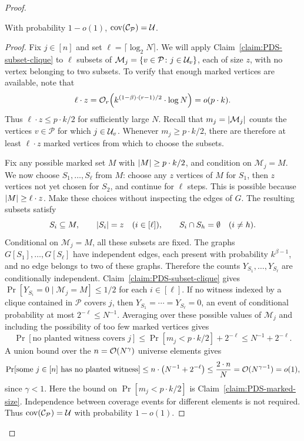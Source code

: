 \begin{proof}
    \begin{claim}\label{claim:PDS-planted-coverage}
        With probability $1-o(1)$, $\operatorname{cov}\mathopen{}\left( \mathcal{C}_{\mathcal P} \right)=\mathcal{U}$.
    \end{claim}
    \begin{proof}
    Fix $j\in[n]$ and set $\ell=\lceil\log_2 N\rceil$. We will apply Claim~\ref{claim:PDS-subset-clique} to $\ell$ subsets of $\mathcal M_j=\{v\in\mathcal P\colon j\in\mathcal{U}_v\}$, each of size $z$, with no vertex belonging to two subsets. To verify that enough marked vertices are available, note that
    \[
        \ell\cdot z=\mathcal{O}_r\mathopen{}\left( k^{(1-\beta)\cdot(r-1)/2}\cdot\log N \right)=o(p\cdot k).
    \]
    Thus $\ell\cdot z\leq p\cdot k/2$ for sufficiently large $N$. Recall that $m_j=\mathopen{}\left| \mathcal M_j \right|$ counts the vertices $v\in\mathcal P$ for which $j\in\mathcal{U}_v$. Whenever $m_j\geq p\cdot k/2$, there are therefore at least $\ell\cdot z$ marked vertices from which to choose the subsets.

    Fix any possible marked set $M$ with $\mathopen{}\left| M \right|\geq p\cdot k/2$, and condition on $\mathcal M_j=M$. We now choose $S_1,\ldots,S_\ell$ from $M$: choose any $z$ vertices of $M$ for $S_1$, then $z$ vertices not yet chosen for $S_2$, and continue for $\ell$ steps. This is possible because $\mathopen{}\left| M \right|\geq\ell\cdot z$. Make these choices without inspecting the edges of $G$. The resulting subsets satisfy
    \[
        S_i\subseteq M,\qquad \mathopen{}\left| S_i \right|=z\quad(i\in[\ell]),
        \qquad S_i\cap S_h=\emptyset\quad(i\neq h).
    \]
    Conditional on $\mathcal M_j=M$, all these subsets are fixed. The graphs $G[S_1],\ldots,G[S_\ell]$ have independent edges, each present with probability $k^{\beta-1}$, and no edge belongs to two of these graphs. Therefore the counts $Y_{S_1},\ldots,Y_{S_\ell}$ are conditionally independent. Claim~\ref{claim:PDS-subset-clique} gives $\Pr[Y_{S_i}=0\mid\mathcal M_j=M]\leq1/2$ for each $i\in[\ell]$. If no witness indexed by a clique contained in $\mathcal P$ covers $j$, then $Y_{S_1}=\cdots=Y_{S_\ell}=0$, an event of conditional probability at most $2^{-\ell}\leq N^{-1}$. Averaging over these possible values of $\mathcal M_j$ and including the possibility of too few marked vertices gives
    \[
        \Pr[\text{no planted witness covers }j]
        \leq\Pr[m_j<p\cdot k/2]+2^{-\ell}
        \leq N^{-1}+2^{-\ell}.
    \]
    A union bound over the $n=\mathcal{O}(N^\gamma)$ universe elements gives
    \[
        \Pr[\text{some }j\in[n]\text{ has no planted witness}]
        \leq n \cdot \mathopen{}\left( N^{-1}+2^{-\ell} \right)
        \leq\frac{2\cdot n}{N}=\mathcal{O}(N^{\gamma-1})=o(1),
    \]
    since $\gamma<1$. Here the bound on $\Pr[m_j<p\cdot k/2]$ is Claim~\ref{claim:PDS-marked-size}. Independence between coverage events for different elements is not required. Thus $\operatorname{cov}\mathopen{}\left( \mathcal{C}_{\mathcal P} \right)=\mathcal{U}$ with probability $1-o(1)$.
    \end{proof}


\end{proof}
